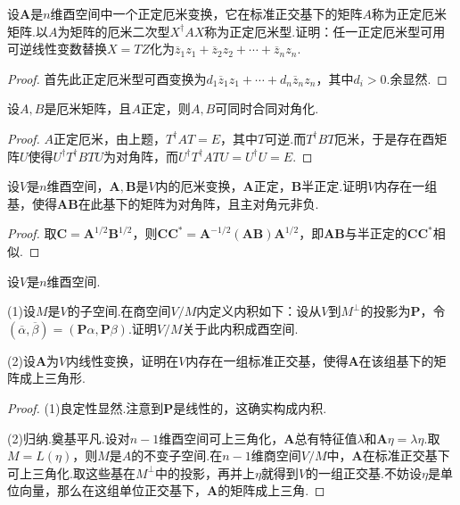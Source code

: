 \begin{prob}[26]
	设$\bm A$是$n$维酉空间中一个正定厄米变换，它在标准正交基下的矩阵$A$称为{\heiti 正定厄米矩阵}.以$A$为矩阵的厄米二次型$X^\dagger AX$称为{\heiti 正定厄米型}.证明：任一正定厄米型可用可逆线性变数替换$X=TZ$化为$\overline{z}_1z_1+\overline{z}_2z_2+\cdots+\overline{z}_nz_n$.
\end{prob}
\begin{proof}
	首先此正定厄米型可酉变换为$d_1\overline{z}_1z_1+\cdots+d_n\overline{z}_nz_n$，其中$d_i>0$.余显然.
\end{proof}
\begin{prob}[27]
	设$A,B$是厄米矩阵，且$A$正定，则$A,B$可同时合同对角化.
\end{prob}
\begin{proof}
	$A$正定厄米，由上题，$T^\dagger AT=E$，其中$T$可逆.而$T^\dagger BT$厄米，于是存在酉矩阵$U$使得$U^\dagger T^\dagger BTU$为对角阵，而$U^\dagger T^\dagger ATU=U^\dagger U=E$.
\end{proof}
\begin{prob}[28]
	设$V$是$n$维酉空间，$\bm A,\bm B$是$V$内的厄米变换，$\bm A$正定，$\bm B$半正定.证明$V$内存在一组基，使得$\bm{AB}$在此基下的矩阵为对角阵，且主对角元非负.
\end{prob}
\begin{proof}
	取$\bm C=\bm A^{1/2}\bm B^{1/2}$，则$\bm C\bm C^*=\bm A^{-1/2}(\bm{AB})\bm A^{1/2}$，即$\bm{AB}$与半正定的$\bm C\bm C^*$相似.
\end{proof}
\begin{prob}[29]
	设$V$是$n$维酉空间.

	(1)设$M$是$V$的子空间.在商空间$V/M$内定义内积如下：设从$V$到$M^\perp$的投影为$\bm P$，令$(\overline{\alpha},\overline{\beta})=(\bm P\alpha,\bm P\beta)$.证明$V/M$关于此内积成酉空间.

	(2)设$\bm A$为$V$内线性变换，证明在$V$内存在一组标准正交基，使得$\bm A$在该组基下的矩阵成上三角形.\footnotemark
\end{prob}
\begin{proof}
	(1)良定性显然.注意到$\bm P$是线性的，这确实构成内积.

	(2)归纳.奠基平凡.设对$n-1$维酉空间可上三角化，$\bm A$总有特征值$\lambda$和$\bm A\eta=\lambda\eta$.取$M=L(\eta)$，则$M$是$A$的不变子空间.在$n-1$维商空间$V/M$中，$\bm A$在标准正交基下可上三角化.取这些基在$M^\perp$中的投影，再并上$\eta$就得到$V$的一组正交基.不妨设$\eta$是单位向量，那么在这组单位正交基下，$\bm A$的矩阵成上三角.
\end{proof}
